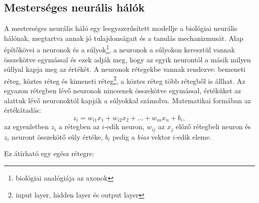 \documentclass[12pt,letterpaper,oneside,openright]{book}
\begin{document}
\subsection{Mesterséges neurális hálók}
A mesterséges neurális háló egy leegyszerűsített modellje a biológiai neurális hálónak, megtartva annak jó tulajdonságait és a tanulás mechanizmusát. Alap építőkövei a neuronok és a súlyok\footnote{biológiai analógiája az axonok}, a neuronok a súlyokon keresztül vannak összekötve egymással és ezek adják meg, hogy az egyik neurontól a másik milyen súllyal kapja meg az értékét. A neuronok rétegekbe vannak rendezve: bemeneti réteg, köztes réteg és kimeneti réteg\footnote{input layer, hidden layer és output layer}, a köztes réteg több rétegből is állhat. Az egyazon rétegben lévő neuronok nincsenek összekötve egymással, értéküket az alattuk lévő neuronoktól kapják a súlyokkal számolva. Matematikai formában az értékátadás:
\begin{equation}
z_i = w_{i1}x_1 + w_{i2}x_{2} + ... + w_{in}x_n + b_i, 
\end{equation}
az egyenletben $z_i$ a rétegben az $i$-edik neuron, $w_{ij}$ az $x_j$ előző rétegbeli neuron és $z_i$ neuront összekötő súly értéke, $b_i$ pedig a \textit{bias} vektor $i$-edik eleme.  

Ez átírható egy egész rétegre:
\end{document}
